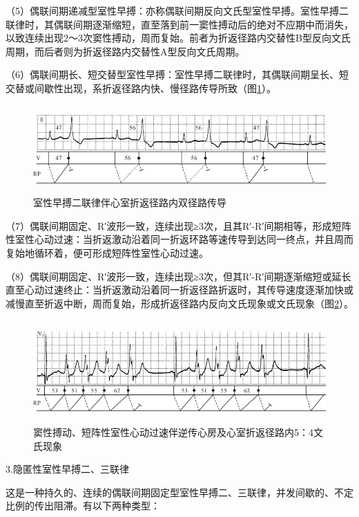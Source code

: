 （5）偶联间期递减型室性早搏：亦称偶联间期反向文氏型室性早搏。室性早搏二联律时，其偶联间期逐渐缩短，直至落到前一窦性搏动后的绝对不应期中而消失，以致连续出现2～3次窦性搏动，周而复始。前者为折返径路内交替性B型反向文氏周期，而后者则为折返径路内交替性A型反向文氏周期。

（6）偶联间期长、短交替型室性早搏：室性早搏二联律时，其偶联间期呈长、短交替或间歇性出现，系折返径路内快、慢径路传导所致（图\ref{fig11-26}）。

\begin{figure}[!htbp]
 \centering
 \includegraphics[width=5.64583in,height=1.32292in]{./images/Image00186.jpg}
 \captionsetup{justification=centering}
 \caption{室性早搏二联律伴心室折返径路内双径路传导}
 \label{fig11-26}
  \end{figure} 

（7）偶联间期固定、R′波形一致，连续出现≥3次，且其R′-R′间期相等，形成短阵性室性心动过速：当折返激动沿着同一折返环路等速传导到达同一终点，并且周而复始地循环着，便可形成短阵性室性心动过速。

（8）偶联间期固定、R′波形一致，连续出现≥3次，但其R′-R′间期逐渐缩短或延长直至心动过速终止：当折返激动沿着同一折返径路折返时，其传导速度逐渐加快或减慢直至折返中断，周而复始，形成折返径路内反向文氏现象或文氏现象（图\ref{fig11-27}）。

\begin{figure}[!htbp]
 \centering
 \includegraphics[width=5.66667in,height=1.54167in]{./images/Image00187.jpg}
 \captionsetup{justification=centering}
 \caption{窦性搏动、短阵性室性心动过速伴逆传心房及心室折返径路内5：4文氏现象}
 \label{fig11-27}
  \end{figure} 

3.隐匿性室性早搏二、三联律

这是一种持久的、连续的偶联间期固定型室性早搏二、三联律，并发间歇的、不定比例的传出阻滞。有以下两种类型：

